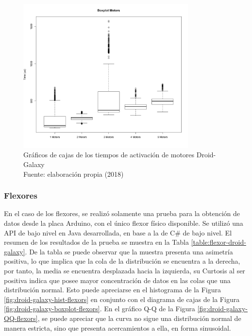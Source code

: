 \begin{figure}[H]
  \begin{center} 
   	\includegraphics[width=0.8\textwidth]{evaluation/graphics/Droid/Galaxy/BoxplotMotorsDroidGalaxy.png} 
   	\captionsetup{justification=centering}
    \captionsetup{justification=centering}
    \caption[Gráficos de cajas de los tiempos de activación de motores de motores Droid-Galaxy]{Gráficos de cajas de los tiempos de activación de motores Droid-Galaxy\\Fuente: elaboración propia (2018)} 
    \label{fig:droid-galaxy-boxplot-motors}
  \end{center}
\end{figure}



\subsubsection{Flexores}
En el caso de los flexores, se realizó solamente una prueba para la obtención de datos desde la placa Arduino, con el único flexor físico disponible. Se utilizó una API de bajo nivel en Java desarrollada, en base a la de C\# de bajo nivel. El resumen de los resultados de la prueba se muestra en la Tabla \ref{table:flexor-droid-galaxy}. De la tabla se puede observar que la muestra presenta una asimetría positiva, lo que implica que la cola de la distribución se encuentra a la derecha, por tanto, la media se encuentra desplazada hacia la izquierda, su Curtosis al ser positiva indica que posee mayor concentración de datos en las colas que una distribución normal. Esto puede apreciarse en el histograma de la Figura \ref{fig:droid-galaxy-hist-flexors} en conjunto con el diagrama de cajas de la Figura \ref{fig:droid-galaxy-boxplot-flexors}. En el gráfico Q-Q de la Figura \ref{fig:droid-galaxy-QQ-flexors}, se puede apreciar que la curva no sigue una distribución normal de manera estricta, sino que presenta acercamientos a ella, en forma sinusoidal.

